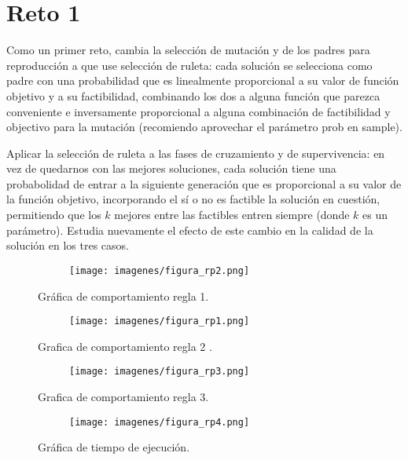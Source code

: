 \documentclass{article}
\begin{document}
\newpage
\section{Reto 1}
Como un primer reto, cambia la selección de mutación y de los padres para reproducción a que use selección de ruleta: cada solución se selecciona como padre con una probabilidad que es linealmente proporcional a su valor de función objetivo y a su factibilidad, combinando los dos a alguna función que parezca conveniente e inversamente proporcional a alguna combinación de factibilidad y objectivo para la mutación (recomiendo aprovechar el parámetro prob en sample).

Aplicar la selección de ruleta a las fases de cruzamiento y de supervivencia: en vez de quedarnos con las mejores soluciones, cada solución tiene una probabolidad de entrar a la siguiente generación que es proporcional a su valor de la función objetivo, incorporando el sí o no es factible la solución en cuestión, permitiendo que los $k$ mejores entre las factibles entren siempre (donde $k$ es un parámetro). Estudia nuevamente el efecto de este cambio en la calidad de la solución en los tres casos\citep{2}.

\begin{figure}[H]
\centering
\begin{subfigure}[b]{1.0\linewidth}
\texttt{[image: imagenes/figura\_rp2.png]}
\end{subfigure}
\caption{Gráfica de comportamiento regla 1.}
\label{fig:westminster}
\end{figure}


\begin{figure}[H]
\centering
\begin{subfigure}[b]{1.0\linewidth}
\texttt{[image: imagenes/figura\_rp1.png]}
\end{subfigure}
\caption{Grafica de comportamiento regla 2 .}
\label{fig:westminster}
\end{figure}



\begin{figure}[H]
\centering
\begin{subfigure}[b]{1.0\linewidth}
\texttt{[image: imagenes/figura\_rp3.png]}
\end{subfigure}
\caption{Grafica de comportamiento regla 3.}
\label{fig:westminster}
\end{figure}
\begin{figure}[H]
\centering
\begin{subfigure}[b]{1.0\linewidth}
\texttt{[image: imagenes/figura\_rp4.png]}
\end{subfigure}
\caption{Gráfica de tiempo de ejecución.}
\label{fig:westminster}
\end{figure}
\end{document}
